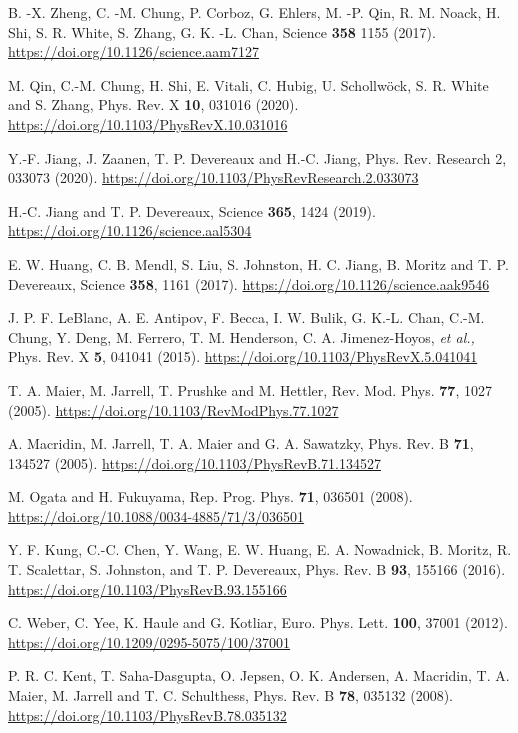 \documentclass[reprint,nofootinbib,nobibnotes,amsmath,amssymb,aps,prb,floatfix]{revtex4-1}
\begin{document}
\begin{thebibliography}{99}
 B. -X. Zheng, C. -M. Chung, P. Corboz, G. Ehlers, M. -P. Qin, R. M. Noack, H. Shi, S. R. White, S. Zhang, G. K. -L. Chan, Science {\bf 358} 1155 (2017). \url{https://doi.org/10.1126/science.aam7127}

 M. Qin, C.-M. Chung, H. Shi, E. Vitali, C. Hubig, U. Schollw\"ock, S. R. White and S. Zhang, Phys. Rev. X {\bf 10}, 031016 (2020). \url{https://doi.org/10.1103/PhysRevX.10.031016}

 Y.-F. Jiang, J. Zaanen, T. P. Devereaux and H.-C. Jiang,  Phys. Rev. Research 2, 033073 (2020). \url{https://doi.org/10.1103/PhysRevResearch.2.033073}

 H.-C. Jiang and T. P. Devereaux, Science {\bf 365}, 1424 (2019). 
\url{https://doi.org/10.1126/science.aal5304}

 E. W. Huang, C. B. Mendl, S. Liu, S. Johnston, H. C. Jiang, B. Moritz and T. P. Devereaux, Science {\bf 358}, 1161 (2017). \url{https://doi.org/10.1126/science.aak9546}

 J. P. F. LeBlanc, A. E. Antipov, F. Becca, I. W. Bulik, G. K.-L. Chan, C.-M. Chung, Y. Deng, M. Ferrero, T. M. Henderson, C. A. Jimenez-Hoyos, {\it et al.,} Phys. Rev. X {\bf 5}, 041041  (2015). \url{https://doi.org/10.1103/PhysRevX.5.041041}

 T. A. Maier, M. Jarrell, T. Prushke and M. Hettler, Rev. Mod. Phys. {\bf 77}, 1027 (2005). \url{https://doi.org/10.1103/RevModPhys.77.1027}

 A. Macridin, M. Jarrell, T. A. Maier and G. A. Sawatzky, Phys. Rev. B {\bf 71}, 134527 (2005). \url{https://doi.org/10.1103/PhysRevB.71.134527}

 M. Ogata and H. Fukuyama, Rep. Prog. Phys. {\bf 71}, 036501 (2008). 
\url{https://doi.org/10.1088/0034-4885/71/3/036501}

 Y. F. Kung, C.-C. Chen, Y. Wang, E. W. Huang, E. A. Nowadnick, B. Moritz, R. T. Scalettar, S. Johnston, and T. P. Devereaux, Phys. Rev. B {\bf 93}, 155166 (2016). \url{https://doi.org/10.1103/PhysRevB.93.155166}

 C. Weber, C. Yee, K. Haule and G. Kotliar, Euro. Phys. Lett. {\bf 100}, 37001 (2012). \url{https://doi.org/10.1209/0295-5075/100/37001}

 P. R. C. Kent, T. Saha-Dasgupta, O. Jepsen, O. K. Andersen, A. Macridin, T. A. Maier, M. Jarrell and T. C. Schulthess, Phys. Rev. B {\bf 78}, 035132 (2008). \url{https://doi.org/10.1103/PhysRevB.78.035132}


\end{thebibliography}
\end{document}

